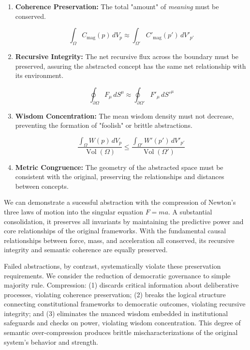 \begin{enumerate}

    \item \textbf{Coherence Preservation:} The total "amount" of \textit{meaning} must be conserved.

    \begin{equation}
    \int_{\Omega} C_{\text{mag}}(p) \, dV_p \approx \int_{\Omega'} C'_{\text{mag}}(p') \, dV'_{p'}
    \end{equation}

    \item \textbf{Recursive Integrity:} The net recursive flux across the boundary must be preserved, assuring the abstracted concept has the same net relationship with its environment.

    \begin{equation}
    \oint_{\partial \Omega} F_\mu \, dS^\mu \approx \oint_{\partial \Omega'} F'_\mu \, dS'^\mu
    \end{equation}

    \item \textbf{Wisdom Concentration:} The mean wisdom density must not decrease, preventing the formation of "foolish" or brittle abstractions.

    \begin{equation}
    \frac{\int_{\Omega} W(p) \, dV_p}{\operatorname{Vol}(\Omega)} \leq \frac{\int_{\Omega'} W'(p') \, dV'_{p'}}{\operatorname{Vol}(\Omega')}
    \end{equation}

    \item \textbf{Metric Congruence:} The geometry of the abstracted space must be consistent with the original, preserving the relationships and distances between concepts.
\end{enumerate}

We can demonstrate a sucessful abstraction with the compression of Newton's three laws of motion into the singular equation \(F=ma\). A substantial consolidation, it preserves all invariants by maintaining the predictive power and core relationships of the original frameworks. With the fundamental causal relationships between force, mass, and acceleration all conserved, its recursive integrity and semantic coherence are equally preserved.

Failed abstractions, by contrast, systematically violate these preservation requirements. We consider the reduction of democratic governance to simple majority rule. Compression: (1) discards critical information about deliberative processes, violating coherence preservation; (2) breaks the logical structure connecting constitutional frameworks to democratic outcomes, violating recursive integrity; and (3) eliminates the nuanced wisdom embedded in institutional safeguards and checks on power, violating wisdom concentration. This degree of semantic over-compression produces brittle mischaracterizations of the original system's behavior and strength.

